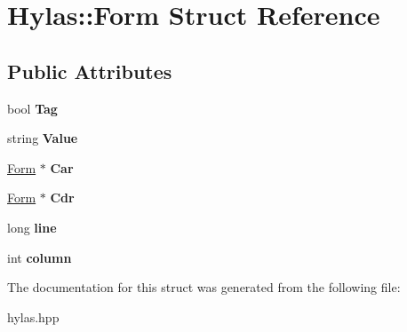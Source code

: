 \hypertarget{structHylas_1_1Form}{
\section{Hylas::Form Struct Reference}
\label{structHylas_1_1Form}
}
\subsection*{Public Attributes}
\begin{DoxyCompactItemize}
\item 
\hypertarget{structHylas_1_1Form_a7504b9866df3e3c436cc67441648aeb4}{
bool {\bfseries Tag}}
\label{structHylas_1_1Form_a7504b9866df3e3c436cc67441648aeb4}

\item 
\hypertarget{structHylas_1_1Form_ad98691a6d2b3b38801bb1ff43ce911e3}{
string {\bfseries Value}}
\label{structHylas_1_1Form_ad98691a6d2b3b38801bb1ff43ce911e3}

\item 
\hypertarget{structHylas_1_1Form_ad9fae7fd1e22557687ab2a0824a6bdf0}{
\hyperlink{structHylas_1_1Form}{Form} $\ast$ {\bfseries Car}}
\label{structHylas_1_1Form_ad9fae7fd1e22557687ab2a0824a6bdf0}

\item 
\hypertarget{structHylas_1_1Form_a0750ded0ffad03b041d0c1aac5dfb710}{
\hyperlink{structHylas_1_1Form}{Form} $\ast$ {\bfseries Cdr}}
\label{structHylas_1_1Form_a0750ded0ffad03b041d0c1aac5dfb710}

\item 
\hypertarget{structHylas_1_1Form_a427709d4997a3162de8ee4aaba56708f}{
long {\bfseries line}}
\label{structHylas_1_1Form_a427709d4997a3162de8ee4aaba56708f}

\item 
\hypertarget{structHylas_1_1Form_afc8b8f6081e5d5287caabf254c524e14}{
int {\bfseries column}}
\label{structHylas_1_1Form_afc8b8f6081e5d5287caabf254c524e14}

\end{DoxyCompactItemize}


The documentation for this struct was generated from the following file:\begin{DoxyCompactItemize}
\item 
hylas.hpp\end{DoxyCompactItemize}
